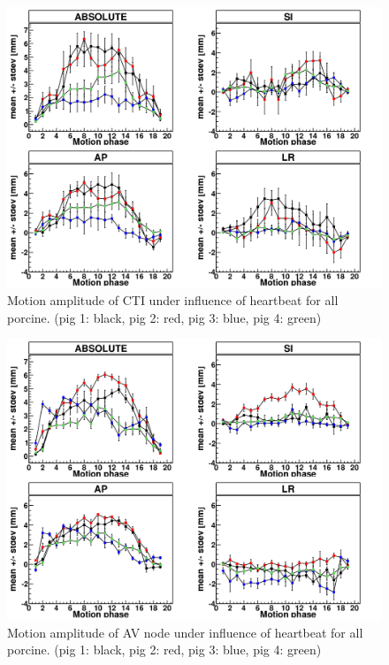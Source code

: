 \documentclass[type=dr, dr=rernat, accentcolor=tud7b,colorbacktitle, bigchapter, openright, twoside, 12pt ]{tudthesis}
\begin{document}
\vspace*{-0.4cm}

\begin{figure}[H]
\begin{center}
 \includegraphics[scale=0.22]{Mayo_CTI_HB.png}
\caption{Motion amplitude of CTI under influence of heartbeat for all porcine. (pig 1: black, pig 2: red, pig 3: blue, 
pig 4: green) }
\label{fig:motion_hb_all_cti}
\end{center}
\end{figure}

\newpage

\begin{figure}[H]
\begin{center}
 \includegraphics[scale=0.22]{Mayo_AV_HB.png}
\caption{Motion amplitude of AV node under influence of heartbeat for all porcine. (pig 1: black, pig 2: red, pig 3: blue, 
pig 4: green) }
\label{fig:motion_hb_all_av}
\end{center}
\end{figure}
\end{document}
